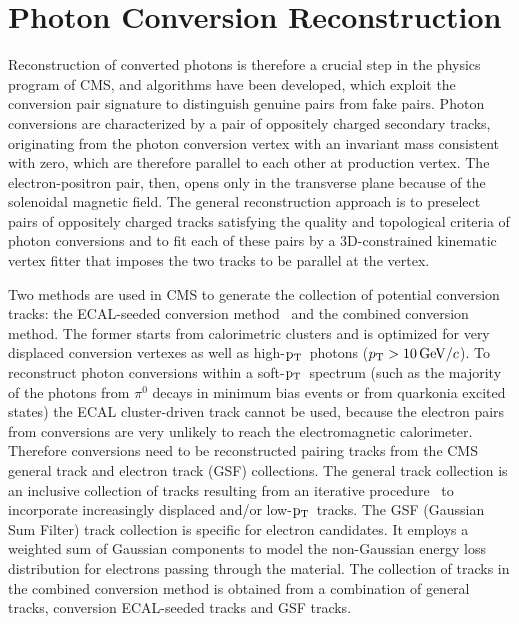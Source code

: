 \documentclass[a4paper]{jpconf}
\def \pt{$\p_{\rm T}$~}
\begin{document}

\section{Photon Conversion Reconstruction}
\label{standard}


Reconstruction of converted photons is therefore a crucial step in the physics program of CMS, and  algorithms have been developed, which exploit the conversion pair signature to distinguish genuine pairs from fake pairs.
%
Photon conversions are characterized by a pair of
oppositely charged secondary tracks, originating from the photon conversion vertex with an
invariant mass consistent with zero,  which are therefore parallel
to each other at production vertex. The electron-positron pair, then,
opens only in the transverse plane because of the solenoidal magnetic field.
The general reconstruction approach is to preselect pairs of oppositely charged tracks satisfying the quality and topological criteria of photon conversions and to fit each of these pairs by a 3D-constrained kinematic vertex 
fitter that imposes the two tracks to be parallel at the vertex. 

Two methods are used in CMS to generate the collection of potential conversion tracks: the ECAL-seeded conversion method~\cite{ecalseeded}  and the combined conversion method. The former starts from calorimetric clusters and is optimized for very displaced conversion vertexes as well as high-\pt photons ($p_{\rm T} >10{\rm \, GeV}/c$).
To reconstruct photon conversions within a soft-\pt spectrum (such as the majority of the photons from $\pi^0$ decays in minimum bias events or from quarkonia excited states) the ECAL cluster-driven track cannot be used,  because the electron pairs from conversions are very unlikely to reach the electromagnetic calorimeter.
Therefore  conversions need to be reconstructed pairing tracks from the  CMS general track and electron track (GSF) collections.
The general track collection is 
 an inclusive collection of   tracks resulting from an iterative procedure~\cite{TRK-10-001} to incorporate increasingly displaced and/or low-\pt tracks.
%
 The GSF (Gaussian Sum Filter) track collection is specific for electron candidates. It employs a 
  weighted  	sum of Gaussian components to model the non-Gaussian energy loss distribution for electrons passing through the material. 
%
The collection of tracks in the combined conversion method is obtained from a combination of general tracks,  conversion ECAL-seeded tracks and GSF tracks.
\end{document}
